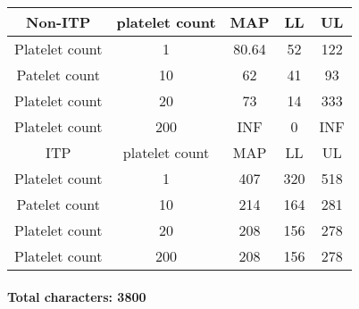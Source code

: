 \documentclass[11pt]{article}
\begin{document}
\begin{center}
 \begin{tabular}{||c c c c c||}
 \hline
 Non-ITP   & platelet count & MAP & LL & UL \\ [0.5ex]
 \hline\hline
 Platelet count & 1 & 80.64 & 52 & 122 \\
 \hline
 Patelet count & 10 & 62 & 41 & 93 \\
 \hline
 Platelet count & 20 & 73 & 14  & 333 \\
 \hline
 Platelet count & 200 & INF & 0 & INF \\
 \hline\hline
  ITP   & platelet count & MAP & LL & UL    \\
\hline\hline
 Platelet count & 1 & 407 & 320  & 518 \\
 \hline
 Patelet count & 10 & 214 & 164 & 281 \\
 \hline
 Platelet count & 20 & 208 & 156 & 278 \\
 \hline
 Platelet count & 200 & 208 & 156 & 278 \\ [1ex]
 \hline
\end{tabular}
\end{center}

\paragraph{}
\textbf{Total characters: 3800}
\end{document}
